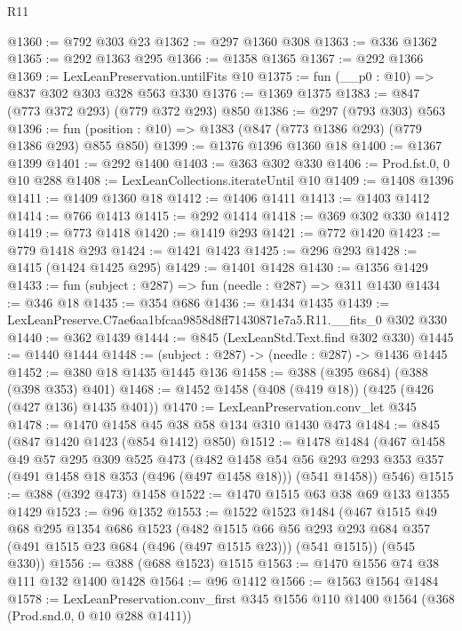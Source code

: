 \begin{lexlean}{R11}
\begin{coremodule}
@1360 := @792 @303 @23
@1362 := @297 @1360 @308
@1363 := @336 @1362
@1365 := @292 @1363 @295
@1366 := @1358 @1365
@1367 := @292 @1366
@1369 := LexLeanPreservation.untilFits @10
@1375 := fun (__p0 : @10) => @837 @302 @303 @328 @563 @330
@1376 := @1369 @1375
@1383 := @847 (@773 @372 @293) (@779 @372 @293) @850
@1386 := @297 (@793 @303) @563
@1396 := fun (position : @10) => @1383 (@847 (@773 @1386 @293) (@779 @1386 @293) @855 @850)
@1399 := @1376 @1396 @1360 @18
@1400 := @1367 @1399
@1401 := @292 @1400
@1403 := @363 @302 @330
@1406 := Prod.fst.{0, 0} @10 @288
@1408 := LexLeanCollections.iterateUntil @10
@1409 := @1408 @1396
@1411 := @1409 @1360 @18
@1412 := @1406 @1411
@1413 := @1403 @1412
@1414 := @766 @1413
@1415 := @292 @1414
@1418 := @369 @302 @330 @1412
@1419 := @773 @1418
@1420 := @1419 @293
@1421 := @772 @1420
@1423 := @779 @1418 @293
@1424 := @1421 @1423
@1425 := @296 @293
@1428 := @1415 (@1424 @1425 @295)
@1429 := @1401 @1428
@1430 := @1356 @1429
@1433 := fun (subject : @287) => fun (needle : @287) => @311 @1430
@1434 := @346 @18
@1435 := @354 @686
@1436 := @1434 @1435
@1439 := LexLeanPreserve.C7ae6aa1bfcaa9858d8ff71430871e7a5.R11.__fits_0 @302 @330
@1440 := @362 @1439
@1444 := @845 (LexLeanStd.Text.find @302 @330)
@1445 := @1440 @1444
@1448 := (subject : @287) -> (needle : @287) -> @1436 @1445
@1452 := @380 @18 @1435 @1445 @136
@1458 := @388 (@395 @684) (@388 (@398 @353) @401)
@1468 := @1452 @1458 (@408 (@419 @18)) (@425 (@426 (@427 @136) @1435 @401))
@1470 := LexLeanPreservation.conv_let @345
@1478 := @1470 @1458 @45 @38 @58 @134 @310 @1430 @473
@1484 := @845 (@847 @1420 @1423 (@854 @1412) @850)
@1512 := @1478
    @1484
    (@467
      @1458
      @49
      @57
      @295
      @309
      @525
      @473
      (@482
        @1458
        @54
        @56
        @293
        @293
        @353
        @357
        (@491 @1458 @18 @353 (@496 (@497 @1458 @18)))
        (@541 @1458))
      @546)
@1515 := @388 (@392 @473) @1458
@1522 := @1470 @1515 @63 @38 @69 @133 @1355 @1429
@1523 := @96 @1352
@1553 := @1522
    @1523
    @1484
    (@467
      @1515
      @49
      @68
      @295
      @1354
      @686
      @1523
      (@482
        @1515
        @66
        @56
        @293
        @293
        @684
        @357
        (@491 @1515 @23 @684 (@496 (@497 @1515 @23)))
        (@541 @1515))
      (@545 @330))
@1556 := @388 (@688 @1523) @1515
@1563 := @1470 @1556 @74 @38 @111 @132 @1400 @1428
@1564 := @96 @1412
@1566 := @1563 @1564 @1484
@1578 := LexLeanPreservation.conv_first
    @345
    @1556
    @110
    @1400
    @1564
    (@368 (Prod.snd.{0, 0} @10 @288 @1411))

\end{coremodule}
\end{lexlean}
